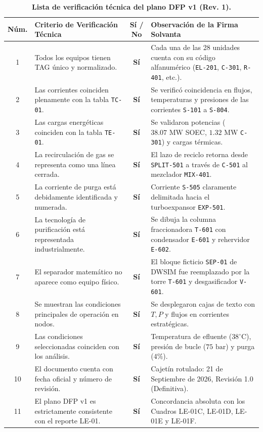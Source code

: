 \documentclass[10pt,letterpaper]{article}
\begin{document}
\begin{table}[H]
\centering
\small
\caption{\textbf{Lista de verificación técnica del plano DFP v1 (Rev. 1).}} \label{tab:cuadro15}
\begin{tabularx}{\textwidth}{c X c p{6.0cm}}
\toprule
\textbf{Núm.} & \textbf{Criterio de Verificación Técnica} & \textbf{Sí / No} & \textbf{Observación de la Firma Solvanta} \\
\midrule
1 & Todos los equipos tienen TAG único y normalizado. & \textbf{Sí} & Cada una de las 28 unidades cuenta con su código alfanumérico (\texttt{EL-201}, \texttt{C-301}, \texttt{R-401}, etc.). \\
2 & Las corrientes coinciden plenamente con la tabla \texttt{TC-01}. & \textbf{Sí} & Se verificó coincidencia en flujos, temperaturas y presiones de las corrientes \texttt{S-101} a \texttt{S-804}. \\
3 & Las cargas energéticas coinciden con la tabla \texttt{TE-01}. & \textbf{Sí} & Se validaron potencias ($38.07\text{ MW}$ SOEC, $1.32\text{ MW}$ \texttt{C-301}) y cargas térmicas. \\
4 & La recirculación de gas se representa como una línea cerrada. & \textbf{Sí} & El lazo de reciclo retorna desde \texttt{SPLIT-501} a través de \texttt{C-501} al mezclador \texttt{MIX-401}. \\
5 & La corriente de purga está debidamente identificada y numerada. & \textbf{Sí} & Corriente \texttt{S-505} claramente delimitada hacia el turboexpansor \texttt{EXP-501}. \\
6 & La tecnología de purificación está representada industrialmente. & \textbf{Sí} & Se dibuja la columna fraccionadora \texttt{T-601} con condensador \texttt{E-601} y rehervidor \texttt{E-602}. \\
7 & El separador matemático no aparece como equipo físico. & \textbf{Sí} & El bloque ficticio \texttt{SEP-01} de DWSIM fue reemplazado por la torre \texttt{T-601} y desgasificador \texttt{V-601}. \\
8 & Se muestran las condiciones principales de operación en nodos. & \textbf{Sí} & Se desplegaron cajas de texto con $T, P$ y flujos en corrientes estratégicas. \\
9 & Las condiciones seleccionadas coinciden con los análisis. & \textbf{Sí} & Temperatura de efluente ($38^\circ\text{C}$), presión de bucle ($75\text{ bar}$) y purga ($4\%$). \\
10 & El documento cuenta con fecha oficial y número de revisión. & \textbf{Sí} & Cajetín rotulado: 21 de Septiembre de 2026, Revisión 1.0 (Definitiva). \\
11 & El plano DFP v1 es estrictamente consistente con el reporte LE-01. & \textbf{Sí} & Concordancia absoluta con los Cuadros LE-01C, LE-01D, LE-01E y LE-01F. \\
\bottomrule
\end{tabularx}
\end{table}
\end{document}

